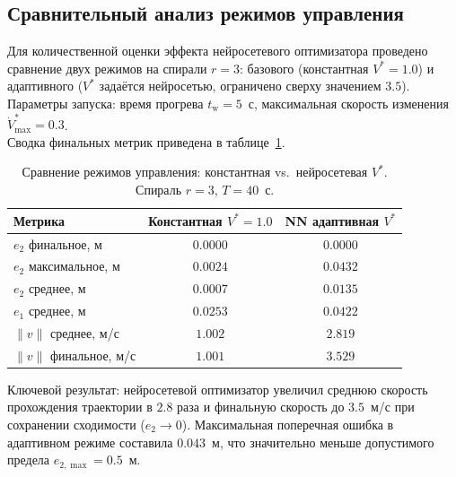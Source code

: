 \subsection{Сравнительный анализ режимов управления}

Для количественной оценки эффекта нейросетевого оптимизатора проведено сравнение двух режимов на спирали $r{=}3$: базового (константная $V^{\ast}=1.0$) и адаптивного ($V^{\ast}$ задаётся нейросетью, ограничено сверху значением $3.5$).
Параметры запуска: время прогрева $t_{\mathrm{w}}=5$~с, максимальная скорость изменения $\dot{V}^{\ast}_{\max}=0.3$.\\
Сводка финальных метрик приведена в таблице~\ref{tab:nn_comparison}.

\begin{table}[htbp]
    \centering
    \caption{Сравнение режимов управления: константная vs.\ нейросетевая $V^{\ast}$. Спираль $r{=}3$, $T=40$~с.}
    \label{tab:nn_comparison}
    \begin{tabular}{|l|c|c|}
        \hline
        Метрика                & Константная $V^{\ast}=1.0$ & NN адаптивная $V^{\ast}$ \\
        \hline
        $e_2$ финальное, м     & $0.0000$                   & $0.0000$                 \\
        $e_2$ максимальное, м  & $0.0024$                   & $0.0432$                 \\
        $e_2$ среднее, м       & $0.0007$                   & $0.0135$                 \\
        $e_1$ среднее, м       & $0.0253$                   & $0.0422$                 \\
        $\|v\|$ среднее, м/с   & $1.002$                    & $2.819$                  \\
        $\|v\|$ финальное, м/с & $1.001$                    & $3.529$                  \\
        \hline
    \end{tabular}
\end{table}

Ключевой результат: нейросетевой оптимизатор увеличил среднюю скорость прохождения траектории в $2.8$ раза и финальную скорость до $3.5$~м/с при сохранении сходимости ($e_2 \to 0$). Максимальная поперечная ошибка в адаптивном режиме составила $0.043$~м, что значительно меньше допустимого предела $e_{2,\max}=0.5$~м.

